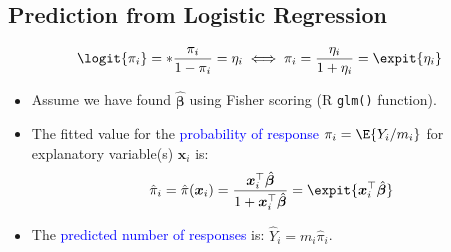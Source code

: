 \documentclass[oneside]{book}\usepackage[]{graphicx}\usepackage[svgnames]{xcolor}
\let\exp\relax%
\let\log\relax%
\providecommand{\Vector}[1]{\bm{#1}}%
\begin{document}
\subsection*{Prediction from Logistic Regression}
\[ \logit{\pi_i}=\log*{\frac{\pi_i}{1-\pi_i}}=\eta_i\iff \pi_i=\frac{\exp{\eta_i}}{1+\exp{\eta_i}}=\expit{\eta_i} \]
\begin{itemize}
      \item Assume we have found $ \hat{\Vector{\beta}} $ using Fisher scoring (R \texttt{glm()} function).
      \item The fitted value for the \textcolor{Blue}{probability of response} $ \pi_i=\E{Y_i/m_i} $ for explanatory
            variable(s) $ \Vector{x}_i $ is:
            \[ \hat{\pi}_i=\hat{\pi}(\Vector{x}_i)=\frac{\exp{\Vector{x}_i^\top \hat{\Vector{\beta}}}}{1+\exp{\Vector{x}_i^\top \hat{\Vector{\beta}}}}=\expit{\Vector{x}_i^\top \hat{\Vector{\beta}}}  \]
      \item The \textcolor{Blue}{predicted number of responses} is: $ \hat{Y}_i=m_i\hat{\pi}_i $.
\end{itemize}
\end{document}
